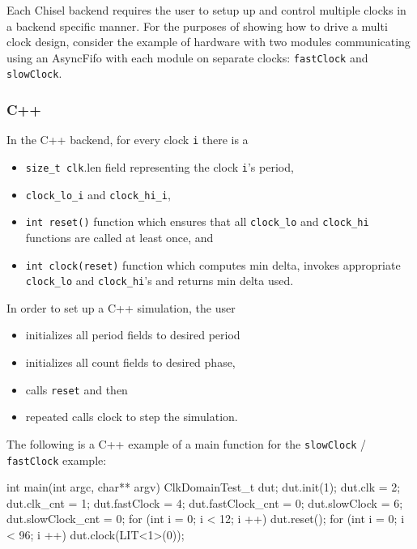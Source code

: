 \documentclass[twocolumn,10pt]{article}
\begin{document}
Each Chisel backend requires the user to setup up and control multiple clocks
in a backend specific manner.  For the purposes of showing how to drive a
multi clock design, consider the example of hardware with two modules
communicating using an AsyncFifo with each module on separate clocks:
\verb+fastClock+ and \verb+slowClock+.

\subsubsection{C++}

In the C++ backend, for every clock \verb+i+ there is a
\begin{itemize}
\item \verb+size_t clk+.len field representing the clock \verb+i+'s period,
\item \verb+clock_lo_i+ and \verb+clock_hi_i+, 
\item \verb+int reset()+ function which ensures that all \verb+clock_lo+ and \verb+clock_hi+ functions are called at least once, and
\item \verb+int clock(reset)+ function which computes min delta, invokes appropriate \verb+clock_lo+ and \verb+clock_hi+'s and returns min delta used.
\end{itemize}

\noindent
In order to set up a C++ simulation, the user 
\begin{itemize}
\item initializes all period fields to desired period
\item initializes all count fields to desired phase, 
\item calls \verb+reset+ and then
\item repeated calls clock to step the simulation.
\end{itemize}

\noindent
The following is a C++ example of a main function for the \verb+slowClock+ / \verb+fastClock+ example:

\begin{scala}
int main(int argc, char** argv) {
  ClkDomainTest_t dut;
  dut.init(1);
  dut.clk = 2;
  dut.clk_cnt = 1;
  dut.fastClock = 4;
  dut.fastClock_cnt = 0;
  dut.slowClock = 6;
  dut.slowClock_cnt = 0;
  for (int i = 0; i < 12; i ++) 
    dut.reset();
  for (int i = 0; i < 96; i ++) 
    dut.clock(LIT<1>(0));
}
\end{scala}
\end{document}
